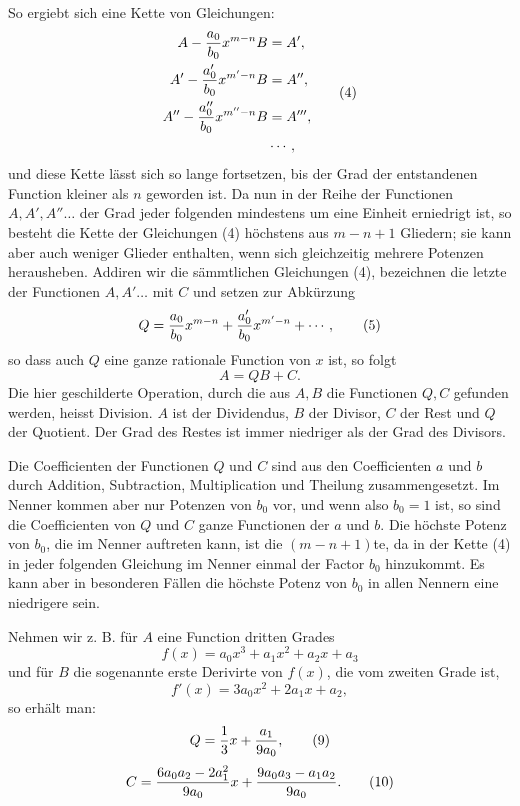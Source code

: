 \documentclass[11pt]{article}
\begin{document}
So ergiebt sich eine Kette von Gleichungen:
\begin{equation}
\begin{aligned}
 A-{a_0\over b_0}x^{m-n}B&=A',\\
 A'-{a'_0\over b_0}x^{m'-n}B&=A'',\\
 A''-{a''_0\over b_0}x^{m''-n}B&=A''',\\
 &\cdots,
\end{aligned}
\tag{4}
\end{equation}
und diese Kette lässt sich so lange fortsetzen, bis der Grad der entstandenen Function kleiner als $n$ geworden ist. Da nun in der Reihe der Functionen $A,A',A''\ldots$ der Grad jeder folgenden mindestens um eine Einheit erniedrigt ist, so besteht die Kette der Gleichungen (4) höchstens aus $m-n+1$ Gliedern; sie kann aber auch weniger Glieder enthalten, wenn sich gleichzeitig mehrere Potenzen herausheben. Addiren wir die sämmtlichen Gleichungen (4), bezeichnen die letzte der Functionen $A,A'\ldots$ mit $C$ und setzen zur Abkürzung
\begin{equation}
 Q={a_0\over b_0}x^{m-n}+{a'_0\over b_0}x^{m'-n}+\cdots,
\tag{5}
\end{equation}
so dass auch $Q$ eine ganze rationale Function von $x$ ist, so folgt
\begin{equation}
 A=QB+C.
\tag{6}
\end{equation}
Die hier geschilderte Operation, durch die aus $A,B$ die Functionen $Q,C$ gefunden werden, heisst Division. $A$ ist der Dividendus, $B$ der Divisor, $C$ der Rest und $Q$ der Quotient. Der Grad des Restes ist immer niedriger als der Grad des Divisors.

Die Coefficienten der Functionen $Q$ und $C$ sind aus den Coefficienten $a$ und $b$ durch Addition, Subtraction, Multiplication und Theilung zusammengesetzt. Im Nenner kommen aber nur Potenzen von $b_0$ vor, und wenn also $b_0=1$ ist, so sind die Coefficienten von $Q$ und $C$ ganze Functionen der $a$ und $b$. Die höchste Potenz von $b_0$, die im Nenner auftreten kann, ist die $(m-n+1)$te, da in der Kette (4) in jeder folgenden Gleichung im Nenner einmal der Factor $b_0$ hinzukommt. Es kann aber in besonderen Fällen die höchste Potenz von $b_0$ in allen Nennern eine niedrigere sein.

Nehmen wir z. B. für $A$ eine Function dritten Grades
\begin{equation}
 f(x)=a_0x^3+a_1x^2+a_2x+a_3
\tag{7}
\end{equation}
und für $B$ die sogenannte erste Derivirte von $f(x)$, die vom zweiten Grade ist,
\begin{equation}
 f'(x)=3a_0x^2+2a_1x+a_2,
\tag{8}
\end{equation}
so erhält man:
\begin{equation}
 Q={1\over 3}x+{a_1\over 9a_0},
\tag{9}
\end{equation}
\begin{equation}
 C={6a_0a_2-2a_1^2\over 9a_0}x+{9a_0a_3-a_1a_2\over 9a_0}.
\tag{10}
\end{equation}
\end{document}
